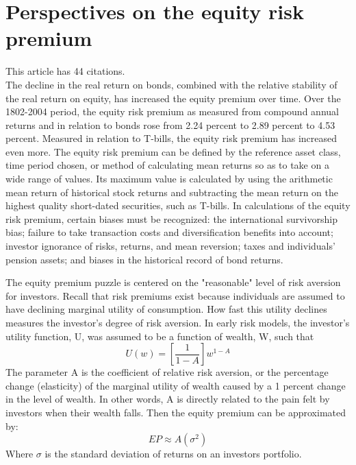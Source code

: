 \documentclass[12 pt]{article}
\begin{document}
\section{Perspectives on the equity risk premium}
This article has 44 citations.\\
The decline in the real return on bonds, combined with the relative stability of the real return on equity, has increased the equity premium over time. Over the 1802-2004 period, the equity risk premium as measured from compound annual returns and in relation to bonds rose from 2.24 percent to 2.89 percent to 4.53 percent. Measured in relation to T-bills, the equity risk premium has increased even more. The
equity risk premium can be defined by the reference asset class, time period chosen, or method of calculating mean returns so as to take on a wide range of values. Its maximum value is calculated by using the arithmetic mean return of historical stock returns and subtracting the mean return on the highest quality short-dated securities, such as T-bills. In calculations of the equity risk premium, certain biases must be recognized: the international survivorship bias; failure to take transaction costs and diversification benefits into account; investor ignorance of risks, returns, and mean reversion; taxes and individuals' pension assets; and biases in the historical record of bond returns.
\par The equity premium puzzle is centered on the "reasonable" level of risk aversion for investors. Recall that risk premiums exist because individuals are assumed to have declining marginal utility of consumption. How fast this utility declines measures the investor's degree of
risk aversion. In early risk models, the investor's utility function, U, was assumed to be a function of wealth, W, such that
\[
U(w)= \left[	\frac{1}{1-A}\right]w^{1-A}
\]
The parameter A is the coefficient of relative risk aversion, or the percentage change (elasticity) of the marginal utility of wealth caused by a 1 percent change in the level of wealth. In other words, A is directly related to the pain felt by investors when their wealth falls. Then the equity premium can be approximated by:
\[
EP \approx A(\sigma^2)
\]
Where $\sigma$ is the standard deviation of returns on an investors portfolio. 
\end{document}
